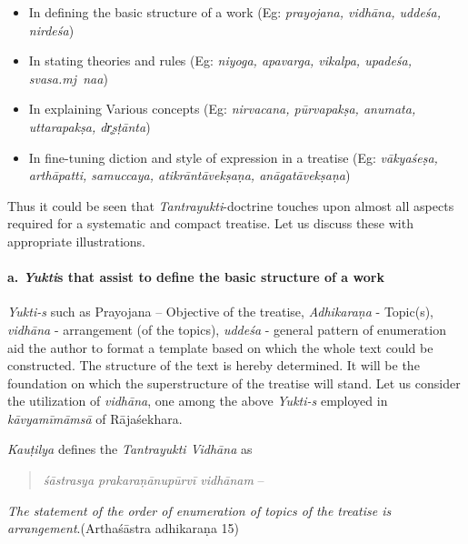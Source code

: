 \begin{itemize}
\item In defining the basic structure of a work (Eg: \textit{prayojana, vidhāna, uddeśa, nirdeśa})

 \item In stating theories and rules (Eg: \textit{niyoga, apavarga, vikalpa, upadeśa, svasa.mj~naa})

 \item In explaining Various concepts (Eg: \textit{nirvacana, pūrvapakṣa, anumata, uttarapakṣa, dr̥ṣṭānta})

 \item In fine-tuning diction and style of expression in a treatise (Eg: \textit{vākyaśeṣa, arthāpatti, samuccaya, atikrāntāvekṣaṇa, anāgatāvekṣaṇa})

\end{itemize}

Thus it could be seen that \textit{Tantrayukti}-doctrine touches upon almost all aspects required for a systematic and compact treatise. Let us discuss these with appropriate illustrations.

\paragraph*{a. \textit{Yukti}s that assist to define the basic structure of a work}

\textit{Yukti-s} such as Prayojana – Objective of the treatise, \textit{Adhikaraṇa} - Topic(s), \textit{vidhāna} - arrangement (of the topics), \textit{uddeśa} - general pattern of enumeration aid the author to format a template based on which the whole text could be constructed. The structure of the text is hereby determined. It will be the foundation on which the superstructure of the treatise will stand. Let us consider the utilization of \textit{vidhāna}, one among the above \textit{Yukti-s} employed in \textit{kāvyamīmāmsā} of Rājaśekhara.

\textit{Kauṭilya} defines the \textit{Tantrayukti Vidhāna} as

\begin{verse}
\textit{śāstrasya prakaraṇānupūrvī vidhānam} –
\end{verse}

\begin{myquote}
\textit{The statement of the order of enumeration of topics of the treatise is arrangement}.\hfill (Arthaśāstra adhikaraṇa 15)
\end{myquote}

